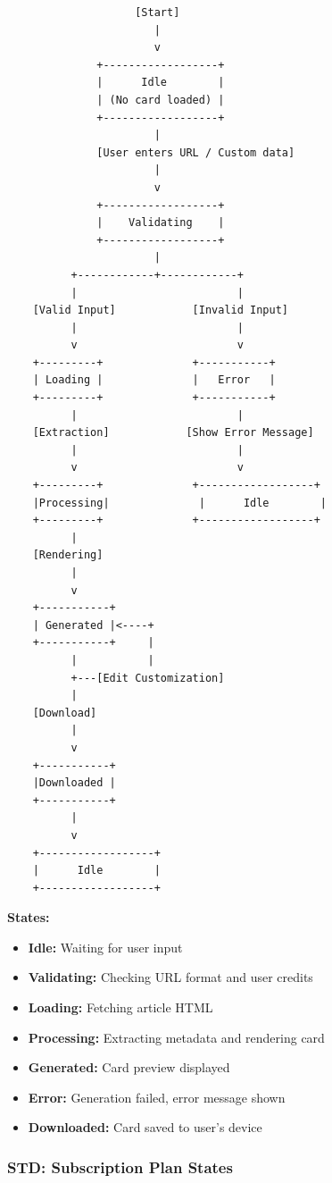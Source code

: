 \documentclass[12pt,a4paper]{article}
\begin{document}
\begin{verbatim}
                    [Start]
                       |
                       v
              +------------------+
              |      Idle        |
              | (No card loaded) |
              +------------------+
                       |
              [User enters URL / Custom data]
                       |
                       v
              +------------------+
              |    Validating    |
              +------------------+
                       |
          +------------+------------+
          |                         |
    [Valid Input]            [Invalid Input]
          |                         |
          v                         v
    +---------+              +-----------+
    | Loading |              |   Error   |
    +---------+              +-----------+
          |                         |
    [Extraction]            [Show Error Message]
          |                         |
          v                         v
    +---------+              +------------------+
    |Processing|              |      Idle        |
    +---------+              +------------------+
          |
    [Rendering]
          |
          v
    +-----------+
    | Generated |<----+
    +-----------+     |
          |           |
          +---[Edit Customization]
          |
    [Download]
          |
          v
    +-----------+
    |Downloaded |
    +-----------+
          |
          v
    +------------------+
    |      Idle        |
    +------------------+
\end{verbatim}

\textbf{States:}
\begin{itemize}
    \item \textbf{Idle:} Waiting for user input
    \item \textbf{Validating:} Checking URL format and user credits
    \item \textbf{Loading:} Fetching article HTML
    \item \textbf{Processing:} Extracting metadata and rendering card
    \item \textbf{Generated:} Card preview displayed
    \item \textbf{Error:} Generation failed, error message shown
    \item \textbf{Downloaded:} Card saved to user's device
\end{itemize}

\subsubsection{STD: Subscription Plan States}
\end{document}
